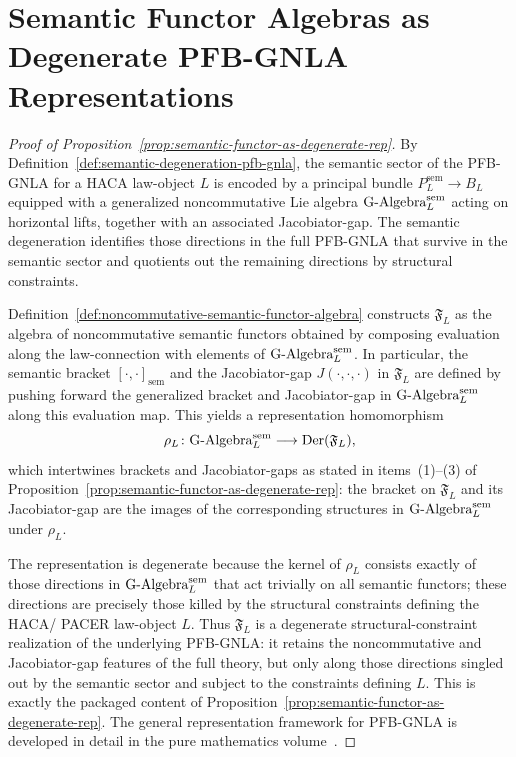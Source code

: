 \documentclass[11pt]{book}
\theoremstyle{plain}
\theoremstyle{definition}
\theoremstyle{remark}
\begin{document}
\section[Semantic Functor Algebras]{Semantic Functor Algebras as Degenerate PFB-GNLA \\Representations}
\label{app:sec-semantic-functor-proof}

\begin{proof}[Proof of Proposition~\ref{prop:semantic-functor-as-degenerate-rep}]
By Definition~\ref{def:semantic-degeneration-pfb-gnla}, the semantic
sector of the PFB-GNLA for a HACA law-object $L$ is encoded by a
principal bundle $P^{\mathrm{sem}}_L \to B_L$ equipped with a
generalized noncommutative Lie algebra
$\text{G-Algebra}^{\mathrm{sem}}_L$ acting on horizontal lifts, together with
an associated Jacobiator-gap. The semantic degeneration identifies
those directions in the full PFB-GNLA that survive in the semantic
sector and quotients out the remaining directions by structural
constraints.

Definition~\ref{def:noncommutative-semantic-functor-algebra} constructs
$\mathfrak{F}_L$ as the algebra of noncommutative semantic functors
obtained by composing evaluation along the law-connection with elements
of $\text{G-Algebra}^{\mathrm{sem}}_L$. In particular, the semantic bracket
$[\cdot,\cdot]_{\mathrm{sem}}$ and the Jacobiator-gap
$J(\cdot,\cdot,\cdot)$ in $\mathfrak{F}_L$ are defined by pushing
forward the generalized bracket and Jacobiator-gap in
$\text{G-Algebra}^{\mathrm{sem}}_L$ along this evaluation map. This yields a
representation homomorphism
\[
  \rho_L \colon \text{G-Algebra}^{\mathrm{sem}}_L
  \longrightarrow
  \mathrm{Der}(\mathfrak{F}_L),
\]
which intertwines brackets and Jacobiator-gaps as stated in
items~(1)--(3) of
Proposition~\ref{prop:semantic-functor-as-degenerate-rep}: the bracket
on $\mathfrak{F}_L$ and its Jacobiator-gap are the images of the
corresponding structures in $\text{G-Algebra}^{\mathrm{sem}}_L$ under
$\rho_L$.

The representation is degenerate because the kernel of $\rho_L$
consists exactly of those directions in $\text{G-Algebra}^{\mathrm{sem}}_L$
that act trivially on all semantic functors; these directions are
precisely those killed by the structural constraints defining the HACA/
PACER law-object $L$. Thus $\mathfrak{F}_L$ is a degenerate
structural-constraint realization of the underlying PFB-GNLA: it
retains the noncommutative and Jacobiator-gap features of the full
theory, but only along those directions singled out by the semantic
sector and subject to the constraints defining $L$. This is exactly the
packaged content of
Proposition~\ref{prop:semantic-functor-as-degenerate-rep}. The general
representation framework for PFB-GNLA is developed in detail in the
pure mathematics volume~\cite{GaoZheng2025GFramework}.
\end{proof}
\end{document}

